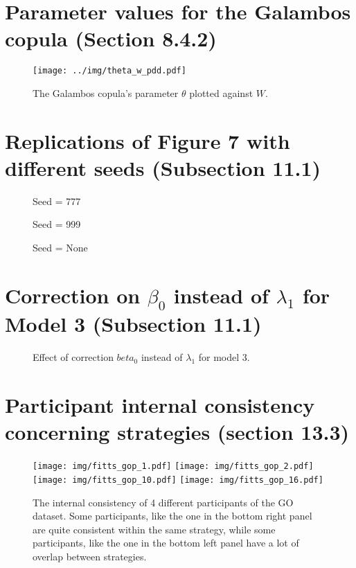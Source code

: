 \documentclass{article}
\begin{document}
\section{Parameter values for the Galambos copula (Section 8.4.2)}
\begin{figure}[htbp]
	\centering
	\texttt{[image: ../img/theta\_w\_pdd.pdf]}
	\caption{The Galambos copula's parameter $\theta$ plotted against $W$.}
	\label{}
\end{figure}

\section{Replications of Figure 7 with different seeds (Subsection 11.1)}

\begin{figure}[htbp]
    \centering
    \caption{Seed = 777}
\end{figure}
\begin{figure}[htbp]
    \centering
    \caption{Seed = 999}
\end{figure}
\begin{figure}[htbp]
    \centering
    \caption{Seed = None}
\end{figure}

\section{Correction on $\beta_0$ instead of $\lambda_1$ for Model 3 (Subsection 11.1)}

\begin{figure}[htbp]
    \centering
    \caption{Effect of correction $beta_0$ instead of $\lambda_1$ for model 3.}
\end{figure}


\section{Participant internal consistency concerning strategies (section 13.3)}

\begin{figure}[htbp]
    \centering
    \texttt{[image: img/fitts\_gop\_1.pdf]}
    \texttt{[image: img/fitts\_gop\_2.pdf]} \\
    \texttt{[image: img/fitts\_gop\_10.pdf]}
    \texttt{[image: img/fitts\_gop\_16.pdf]}
    \caption{The internal consistency of 4 different participants of the GO dataset. Some participants, like the one in the bottom right panel are quite consistent within the same strategy, while some participants, like the one in the bottom left panel have a lot of overlap between strategies.}
\end{figure}
\end{document}
